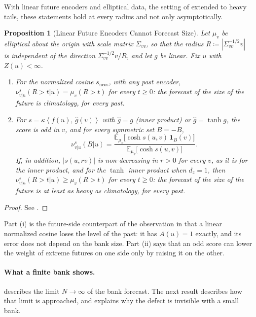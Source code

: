 \documentclass[11pt]{article}
\theoremstyle{plain}
\newtheorem{proposition}[theorem]{Proposition}
\theoremstyle{definition}
\theoremstyle{remark}
\newcommand{\E}{\mathbb{E}}
\newcommand{\define}{\coloneqq}
\newcommand{\IP}[2]{\left\langle #1,\, #2 \right\rangle}
\newcommand{\abs}[1]{\left\lvert #1 \right\rvert}
\newcommand{\indicator}{\mathbf{1}}
\newcommand{\sncos}{s_{\mathrm{ncos}}}
\begin{document}
With linear future encoders and elliptical data, the setting of
\cite{baptista2025mathematical} extended to heavy tails, these statements
hold at every radius and not only asymptotically.

\begin{proposition}[Linear Future Encoders Cannot Forecast Size]
 \label{prop:linearsat}
 Let $\mu_v$ be elliptical about the origin with scale matrix $\Sigma_{vv}$,
 so that the radius $R\define\abs{\Sigma_{vv}^{-1/2}v}$ is independent of the
 direction $\Sigma_{vv}^{-1/2}v/R$, and let $g$ be linear. Fix $u$ with
 $Z(u)<\infty$.
 \begin{enumerate}[label=(\roman*)]
  \item For the normalized cosine $\sncos$, with any past encoder,
        $\nu^{s}_{v\vert u}(R>t\vert u)=\mu_v(R>t)$ for every $t\ge0$: the
        forecast of the size of the future is climatology, for every past.
  \item For $s=\kappa\IP{f(u)}{\hat g(v)}$ with $\hat g=g$ (inner product)
        or $\hat g=\tanh g$, the score is odd in $v$, and for every
        symmetric set $B=-B$,
        \begin{equation*}
         \nu^{s}_{v\vert u}(B\vert u)=\frac{\E_{\mu_v}\bigl[\cosh s(u,v)\,\indicator_B(v)\bigr]}{\E_{\mu_v}\bigl[\cosh s(u,v)\bigr]}.
        \end{equation*}
        If, in addition, $\abs{s(u,rv)}$ is non-decreasing in $r>0$ for every
        $v$, as it is for the inner product, and for the $\tanh$ inner
        product when $d_z=1$, then
        $\nu^{s}_{v\vert u}(R>t\vert u)\ge\mu_v(R>t)$ for every $t\ge0$: the
        forecast of the size of the future is at least as heavy as
        climatology, for every past.
 \end{enumerate}
\end{proposition}
\begin{proof}
 See .
\end{proof}

Part (i) is the future-side counterpart of the observation in
 that a linear normalized cosine loses the level of
the past: it has $\bar A(u)=1$ exactly, and its error does not depend on the
bank size. Part (ii) says that an odd score can lower the weight of extreme
futures on one side only by raising it on the other.

\paragraph{What a finite bank shows.}
 describes the limit $N\to\infty$ of the bank forecast. The
next result describes how that limit is approached, and explains why the
defect is invisible with a small bank.
\end{document}
